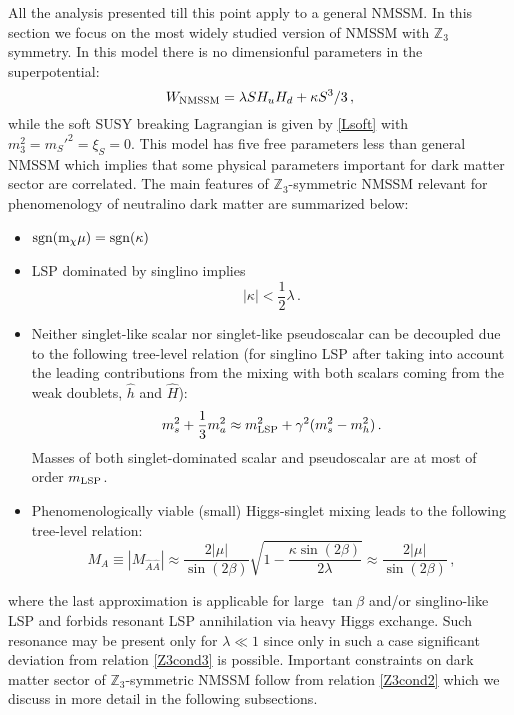 \documentclass[12pt,twoside]{article}
\begin{document}
All the analysis presented till this point apply to a general NMSSM. 
In this section we focus on the most widely studied version of NMSSM with 
$\mathbb{Z}_3$ symmetry. In this model there is no dimensionful 
parameters in the superpotential:
\begin{equation}
\label{W_Z3NMSSM}
 W_{\rm NMSSM}= \lambda SH_uH_d + \kappa S^3/3 \,,
\end{equation}
while the soft SUSY breaking Lagrangian is given by \eqref{Lsoft} with $m_3^2=m_S'^2=\xi_S=0$. This model has five free parameters less than general
NMSSM which implies that some physical parameters important for dark matter sector are correlated. The main features of $\mathbb{Z}_3$-symmetric
NMSSM relevant for phenomenology of neutralino dark matter are summarized below:
%
\begin{itemize}
\item ${\rm sgn ( m_\chi \mu)}={\rm sgn}(\kappa)$
 \item LSP dominated by singlino implies
%
 \begin{equation}
 \label{Z3cond1}
  |\kappa| < \frac12\lambda \,.
 \end{equation}
%
\item Neither singlet-like scalar nor singlet-like pseudoscalar can be 
decoupled due to the following tree-level relation 
(for singlino LSP after taking into account the leading 
contributions from the mixing with both scalars coming from 
the weak doublets, $\hat{h}$ and $\hat{H}$):
%
\begin{equation}
 \label{Z3cond2}
 m_s^2 + \frac13 m_a^2  \approx  m_{\rm LSP}^2 + \gamma^2(m_s^2 - m_h^2) \,.
\end{equation}
%
Masses of both singlet-dominated scalar and pseudoscalar are at most 
of order $m_{\rm LSP}$.
\item Phenomenologically viable (small) Higgs-singlet mixing leads to the following  tree-level relation:
\begin{equation}
 \label{Z3cond3}
 M_A\equiv |M_{\hat{A}\hat{A}}| \approx \frac{2 |\mu|}{\sin (2\beta)}\sqrt{1-\frac{\kappa\sin (2\beta)}{2\lambda}} \approx \frac{2
|\mu|}{\sin(2\beta)} \,,
\end{equation}
\end{itemize}
where the last approximation is applicable for large $\tan\beta$ and/or singlino-like LSP and forbids resonant LSP annihilation via heavy Higgs
exchange. Such resonance may be present only for $\lambda\ll1$ since only in such a case significant deviation from relation \eqref{Z3cond3}
is possible. Important constraints on dark matter sector of $\mathbb{Z}_3$-symmetric NMSSM follow from relation \eqref{Z3cond2} which we discuss in
more detail in the following subsections.
\end{document}

